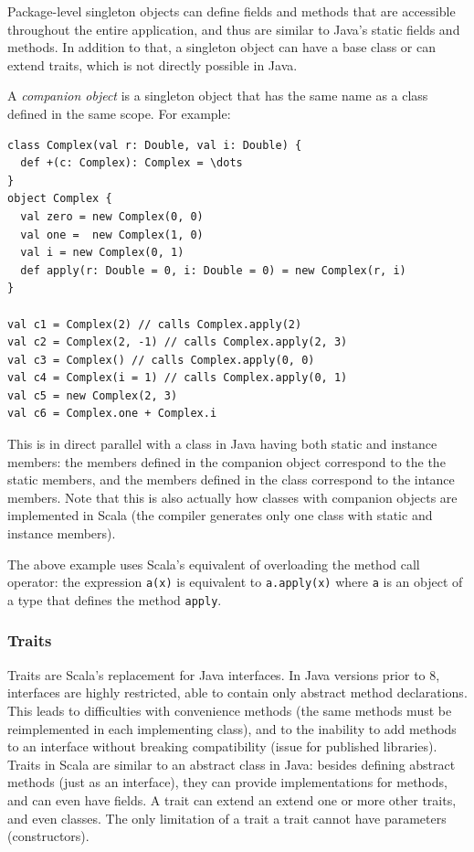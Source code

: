 Package-level singleton objects can define fields and methods that are accessible throughout the entire application, and thus are similar to Java's static fields and methods. In addition to that, a singleton object can have a base class or can extend traits, which is not directly possible in Java.

A \emph{companion object} is a singleton object that has the same name as a class defined in the same scope. For example:

\begin{lstlisting}
class Complex(val r: Double, val i: Double) {
  def +(c: Complex): Complex = \dots
}
object Complex {
  val zero = new Complex(0, 0)
  val one =  new Complex(1, 0)
  val i = new Complex(0, 1)
  def apply(r: Double = 0, i: Double = 0) = new Complex(r, i)
}

val c1 = Complex(2) // calls Complex.apply(2)
val c2 = Complex(2, -1) // calls Complex.apply(2, 3)
val c3 = Complex() // calls Complex.apply(0, 0)
val c4 = Complex(i = 1) // calls Complex.apply(0, 1)
val c5 = new Complex(2, 3)
val c6 = Complex.one + Complex.i
\end{lstlisting}

This is in direct parallel with a class in Java having both static and instance members: the members defined in the companion object correspond to the the static members, and the members defined in the class correspond to the intance members. Note that this is also actually how classes with companion objects are implemented in Scala (the compiler generates only one class with static and instance members).

The above example uses Scala's equivalent of overloading the method call operator: the expression \texttt{a(x)} is equivalent to \texttt{a.apply(x)} where \texttt{a} is an object of a type that defines the method \texttt{apply}.

\subsubsection{Traits}

Traits are Scala's replacement for Java interfaces. In Java versions prior to 8, interfaces are highly restricted, able to contain only abstract method declarations. This leads to difficulties with convenience methods (the same methods must be reimplemented in each implementing class), and to the inability to add methods to an interface without breaking compatibility (issue for published libraries). Traits in Scala are similar to an abstract class in Java: besides defining abstract methods (just as an interface), they can provide implementations for methods, and can even have fields. A trait can extend an extend one or more other traits, and even classes. The only limitation of a trait a trait cannot have parameters (constructors).

